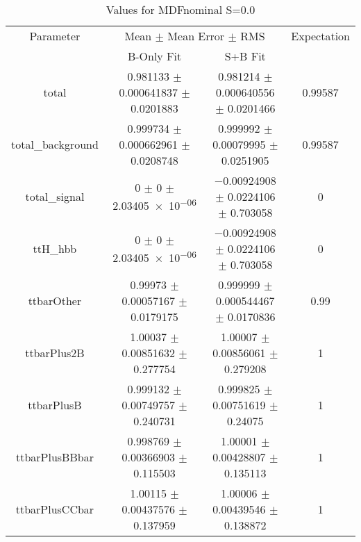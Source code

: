 \begin{table}
\centering
\caption{Values for MDFnominal S=0.0}
\begin{tabular}{cccc}
\toprule
Parameter & \multicolumn{2}{c}{Mean $\pm$ Mean Error $\pm$ RMS} & Expectation\\
 & B-Only Fit & S+B Fit & \\
\midrule
total & \num{0.981133} $\pm$ \num{0.000641837} $\pm$ \num{0.0201883} & \num{0.981214} $\pm$ \num{0.000640556} $\pm$ \num{0.0201466} & \num{0.99587}\\
total\_background & \num{0.999734} $\pm$ \num{0.000662961} $\pm$ \num{0.0208748} & \num{0.999992} $\pm$ \num{0.00079995} $\pm$ \num{0.0251905} & \num{0.99587}\\
total\_signal & \num{0} $\pm$ \num{0} $\pm$ \num{2.03405e-06} & \num{-0.00924908} $\pm$ \num{0.0224106} $\pm$ \num{0.703058} & \num{0}\\
ttH\_hbb & \num{0} $\pm$ \num{0} $\pm$ \num{2.03405e-06} & \num{-0.00924908} $\pm$ \num{0.0224106} $\pm$ \num{0.703058} & \num{0}\\
ttbarOther & \num{0.99973} $\pm$ \num{0.00057167} $\pm$ \num{0.0179175} & \num{0.999999} $\pm$ \num{0.000544467} $\pm$ \num{0.0170836} & \num{0.99}\\
ttbarPlus2B & \num{1.00037} $\pm$ \num{0.00851632} $\pm$ \num{0.277754} & \num{1.00007} $\pm$ \num{0.00856061} $\pm$ \num{0.279208} & \num{1}\\
ttbarPlusB & \num{0.999132} $\pm$ \num{0.00749757} $\pm$ \num{0.240731} & \num{0.999825} $\pm$ \num{0.00751619} $\pm$ \num{0.24075} & \num{1}\\
ttbarPlusBBbar & \num{0.998769} $\pm$ \num{0.00366903} $\pm$ \num{0.115503} & \num{1.00001} $\pm$ \num{0.00428807} $\pm$ \num{0.135113} & \num{1}\\
ttbarPlusCCbar & \num{1.00115} $\pm$ \num{0.00437576} $\pm$ \num{0.137959} & \num{1.00006} $\pm$ \num{0.00439546} $\pm$ \num{0.138872} & \num{1}\\
\bottomrule
\end{tabular}
\end{table}
